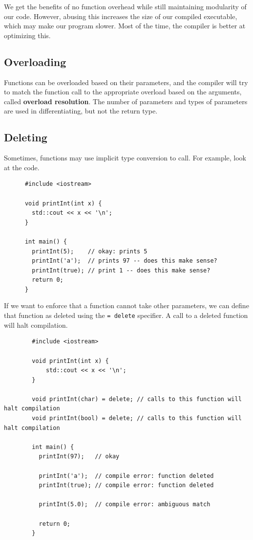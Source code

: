 \documentclass{article}
\newcounter{definition}[section]
\newcounter{example}[section]
\newcounter{code}[section]
\begin{document}
    We get the benefits of no function overhead while still maintaining modularity of our code. However, abusing this increases the size of our compiled executable, which may make our program slower. Most of the time, the compiler is better at optimizing this.  

  \subsection{Overloading} 

    Functions can be overloaded based on their parameters, and the compiler will try to match the function call to the appropriate overload based on the arguments, called \textbf{overload resolution}. The number of parameters and types of parameters are used in differentiating, but not the return type. 

  \subsection{Deleting}

    Sometimes, functions may use implicit type conversion to call. For example, look at the code. 

    \begin{lstlisting}
      #include <iostream>

      void printInt(int x) {
        std::cout << x << '\n';
      }

      int main() {
        printInt(5);    // okay: prints 5
        printInt('a');  // prints 97 -- does this make sense?
        printInt(true); // print 1 -- does this make sense?
        return 0;
      }
    \end{lstlisting}

    \begin{definition}
      \label{def:function-deleting}
      If we want to enforce that a function cannot take other parameters, we can define that function as deleted using the \texttt{= delete} specifier. A call to a deleted function will halt compilation. 
      \begin{lstlisting}
        #include <iostream>

        void printInt(int x) {
            std::cout << x << '\n';
        }

        void printInt(char) = delete; // calls to this function will halt compilation
        void printInt(bool) = delete; // calls to this function will halt compilation

        int main() {
          printInt(97);   // okay

          printInt('a');  // compile error: function deleted
          printInt(true); // compile error: function deleted

          printInt(5.0);  // compile error: ambiguous match

          return 0;
        } 
      \end{lstlisting}
    \end{definition}
\end{document}
